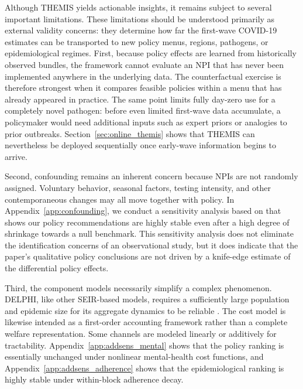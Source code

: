 \documentclass[msom,blindrev]{informs3} %
\newcommand{\rev}[1]{{\color{blue}#1}}
\begin{document}
{\color{blue}
Although THEMIS yields actionable insights, it remains subject to several important limitations. These limitations should be understood primarily as external validity concerns: they determine how far the first-wave COVID-19 estimates can be transported to new policy menus, regions, pathogens, or epidemiological regimes. First, because policy effects are learned from historically observed bundles, the framework cannot evaluate an NPI that has never been implemented anywhere in the underlying data. The counterfactual exercise is therefore strongest when it compares feasible policies within a menu that has already appeared in practice. The same point limits fully day-zero use for a completely novel pathogen: before even limited first-wave data accumulate, a policymaker would need additional inputs such as expert priors or analogies to prior outbreaks. Section~\ref{sec:online_themis} shows that THEMIS can nevertheless be deployed sequentially once early-wave information begins to arrive.

Second, confounding remains an inherent concern because NPIs are not randomly assigned. Voluntary behavior, seasonal factors, testing intensity, and other contemporaneous changes may all move together with policy. \rev{In Appendix~\ref{app:confounding}, we conduct a sensitivity analysis based on \citepmain{cinelli2020making} that shows our policy recommendations are highly stable even after a high degree of shrinkage towards a null benchmark. This sensitivity analysis does not eliminate the identification concerns of an observational study, but it does indicate that the paper's qualitative policy conclusions are not driven by a knife-edge estimate of the differential policy effects.}

Third, the component models necessarily simplify a complex phenomenon. DELPHI, like other SEIR-based models, requires a sufficiently large population and epidemic size for its aggregate dynamics to be reliable . The cost model is likewise intended as a first-order accounting framework rather than a complete welfare representation. Some channels are modeled linearly or additively for tractability. \rev{Appendix~\ref{app:addsens_mental} shows that the policy ranking is essentially unchanged under nonlinear mental-health cost functions, and Appendix~\ref{app:addsens_adherence} shows that the epidemiological ranking is highly stable under within-block adherence decay.}

}
\end{document}
